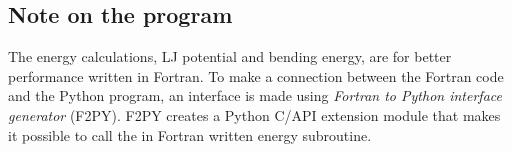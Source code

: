 \subsection{Note on the program}
The energy calculations, LJ potential and bending energy, are for better performance written in Fortran. To make a connection between the Fortran code and the Python program, an interface is made using \emph{Fortran to Python interface generator} (F2PY). F2PY creates a Python C/API extension module that makes it possible to call the in Fortran written energy subroutine.